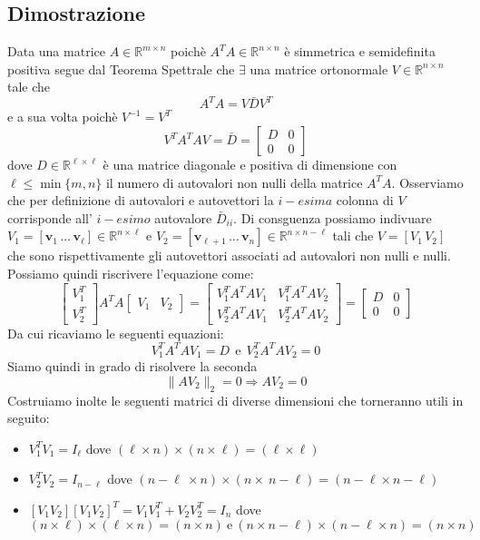 \documentclass[11pt]{article}
\newcommand{\R}{\mathbb R}
\begin{document}
\subsection{Dimostrazione}
Data una matrice $A \in \R^{m \times n}$ poichè $A^TA \in \R^{n \times n}$ è simmetrica e semidefinita positiva segue dal Teorema Spettrale che $\exists$ una matrice ortonormale $V \in \R^{n \times n}$ tale che $$ A^TA=V\bar{D}V^T$$ e a sua volta poichè $V^{-1}=V^T$ $$V^TA^TAV=\bar{D}= \begin{bmatrix}D & 0 \\ 0 & 0\end{bmatrix}$$
dove $D \in \R^{\ell \times \ell}$ è una matrice diagonale e positiva di dimensione con $\ell \leq \min{\{m,n\}}$ il numero di autovalori non nulli della matrice $A^TA$. 
Osserviamo che per definizione di autovalori e autovettori la $i-esima$ colonna di $V$ corrisponde all' $i-esimo$ autovalore $\bar{D}_{ii}$. Di consguenza possiamo indivuare $V_1=[\mathbf{v}_1 \, \dots \, \mathbf{v}_{\ell}] \in \R^{n \times \ell}$ e $V_2=[\mathbf{v}_{\ell+1} \, \dots \, \mathbf{v}_n] \in \R^{n \times n-\ell}$ tali che $V=[V_1 \, V_2]$ che sono rispettivamente gli autovettori associati ad autovalori non nulli e nulli. 
Possiamo quindi riscrivere l'equazione come:
$$ \begin{bmatrix} V_1^T \\ V_2^T \end{bmatrix}
A^TA \begin{bmatrix} V_1 & \!\! V_2 \end{bmatrix}
= \begin{bmatrix}  V_1^TA^TAV_1 & V_1^TA^TAV_2 \\
  V_2^TA^TAV_1 & V_2^TA^TAV_2
\end{bmatrix} = \begin{bmatrix} D & 0 \\ 0 & 0 \end{bmatrix}$$
Da cui ricaviamo le seguenti equazioni:
$$V_1^TA^TAV_1=D \ \ \text{e} \ \ V_2^TA^TAV_2=0$$ 
Siamo quindi in grado di risolvere la seconda
$$\|AV_2\|_2=0 \Rightarrow AV_2=0$$ 
Costruiamo inolte le seguenti matrici di diverse dimensioni che torneranno utili in seguito:\\
\begin{itemize}
	\item$V_1^TV_1=I_{\ell}$ dove $(\ell \times n)\times(n \times \ell)=(\ell \times \ell)$
	\item$V_2^TV_2=I_{n-\ell}$ dove $(n-\ell \ \times n)\times(n \times \ n-\ell)=(n-\ell \times n-\ell)$
	\item$[V_1 V_2][V_1 V_2]^T=V_1V_1^T+V_2V_2^T=I_n$ dove\\
 	$$(n \times \ell)\times(\ell \times n)=(n \times n) \ \text{e} \ (n \times n-\ell)\times(n-\ell \times  n)=(n \times n)$$
\end{itemize}
\end{document}

